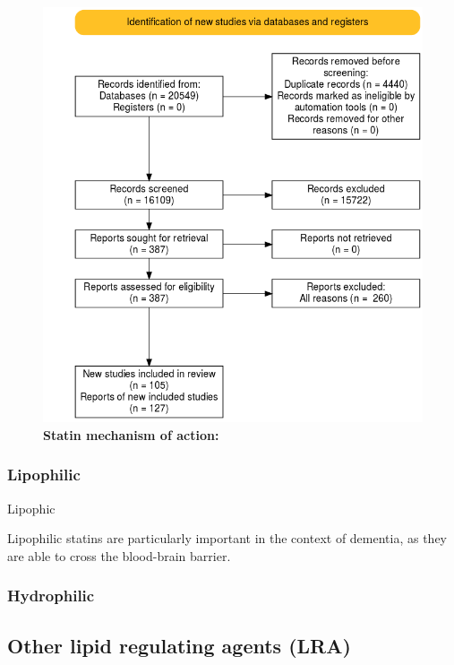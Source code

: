 \documentclass[a4paper, twoside]{templates/ociamthesis}
\begin{document}
\begin{figure}
\includegraphics[width=1\linewidth]{figures/sys-rev/prisma_flow} \caption[Statin mechanism of action]{\textbf{Statin mechanism of action:}}\label{fig:statin-mechanisam}
\end{figure}

\hypertarget{lipophilic}{%
\subsubsection{Lipophilic}\label{lipophilic}}

Lipophic

Lipophilic statins are particularly important in the context of dementia, as they are able to cross the blood-brain barrier.

\hypertarget{hydrophilic}{%
\subsubsection{Hydrophilic}\label{hydrophilic}}

\hypertarget{other-lipid-regulating-agents-lra}{%
\subsection{Other lipid regulating agents (LRA)}\label{other-lipid-regulating-agents-lra}}
\end{document}
